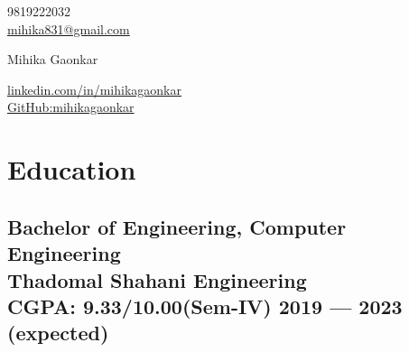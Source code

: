 \documentclass[10pt]{article}
\begin{document}
\begin{center}
    \begin{minipage}[b]{0.24\textwidth}
            \large 9819222032 \\
            \large \href{mailto:mihika831@gmail.com}{mihika831@gmail.com} 
    \end{minipage}%
    \begin{minipage}[b]{0.44\textwidth}
            \centering
            {\HUGE Mihika Gaonkar} \\ %
            \vspace{0.1cm}
            {\color{UI_blue} \Large{}} 
    \end{minipage}%
    \begin{minipage}[b]{0.30\textwidth}
            \flushright \large  %
            {\href{https://www.linkedin.com/in/mihikagaonkar/}{linkedin.com/in/mihikagaonkar} } \\
            \href{https://github.com/mihikagaonkar/}{GitHub:mihikagaonkar}
    \end{minipage}   
    
\vspace{-0.15cm} 
\end{center}






\section{Education }
\subsection*{Bachelor of Engineering, Computer Engineering\\ {\normalsize \normalfont Thadomal Shahani Engineering\\ CGPA: 9.33/10.00(Sem-IV)} \hfill  2019 ---  2023 (expected)} 
\vspace{0.2cm}

\end{document}
